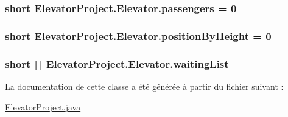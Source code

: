 \hypertarget{classElevatorProject_1_1Elevator_a7e09eed6c6786dc1c184825738724d63}{
\subsubsection[{passengers}]{\setlength{\rightskip}{0pt plus 5cm}short Elevator\-Project.\-Elevator.\-passengers = 0\hspace{0.3cm}{\ttfamily [package]}}}\label{classElevatorProject_1_1Elevator_a7e09eed6c6786dc1c184825738724d63}
\hypertarget{classElevatorProject_1_1Elevator_ab1b368c5ffad580c3693bd7ada72285a}{
\subsubsection[{position\-By\-Height}]{\setlength{\rightskip}{0pt plus 5cm}short Elevator\-Project.\-Elevator.\-position\-By\-Height = 0\hspace{0.3cm}{\ttfamily [package]}}}\label{classElevatorProject_1_1Elevator_ab1b368c5ffad580c3693bd7ada72285a}
\hypertarget{classElevatorProject_1_1Elevator_a1a2cb5a9024a1aa576f3c41637eac36f}{
\subsubsection[{waiting\-List}]{\setlength{\rightskip}{0pt plus 5cm}short \mbox{[}$\,$\mbox{]} Elevator\-Project.\-Elevator.\-waiting\-List\hspace{0.3cm}{\ttfamily [package]}}}\label{classElevatorProject_1_1Elevator_a1a2cb5a9024a1aa576f3c41637eac36f}


La documentation de cette classe a été générée à partir du fichier suivant \-:\begin{DoxyCompactItemize}
\item 
\hyperlink{ElevatorProject_8java}{Elevator\-Project.\-java}\end{DoxyCompactItemize}
